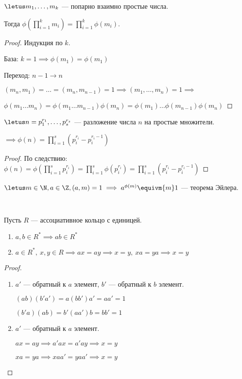 \begin{follow}
    $\letus m_1, \ldots, m_k$ --- попарно взаимно простые числа.

    Тогда $\phi(\prod\limits_{i=1}^k m_i) = \prod\limits_{i=1}^k \phi(m_i)$.
\end{follow}

\begin{proof}
    Индукция по $k$.

    База: $k = 1 \implies \phi(m_1) = \phi(m_1)$
    
    Переход: $n-1 \to n$
    
    $(m_n, m_1) = \ldots = (m_n, m_{n-1}) = 1 \implies (m_1, \ldots, m_n) = 1 \implies$
    
    $\phi(m_1 \ldots m_n) = \phi(m_1 \ldots m_{n-1}) \phi(m_n) = \phi(m_1) \ldots \phi(m_{n-1}) \phi(m_n)$
\end{proof}

\begin{follow}
    $\letus n = p_1^{r_1}, \ldots, p_s^{r_s}$ --- разложение числа $n$ на простые множители.
    
    $\implies \phi(n) = \prod\limits_{i=1}^s (p_i^{r_i} - p_i^{r_i-1})$
\end{follow}

\begin{proof}
    По следствию: $\phi(n) = \phi(\prod\limits_{i=1}^s p_i^{r_i}) = \prod\limits_{i=1}^s \phi(p_i^{r_i}) = \prod\limits_{i=1}^s (p_i^{r_i} - p_i^{r_i-1})$
\end{proof}

\begin{theorem}
    $\letus m \in \N, a \in \Z, (a, m) = 1 \implies a^{\phi(m)} \equivm{m} 1$ --- теорема Эйлера.
\end{theorem}

\begin{lemma}~

    Пусть $R$ --- ассоциативное кольцо с единицей.
    \begin{enumerate}
        \item $a, b \in R^* \implies ab \in R^*$
        
        \item $a \in R^*,~x,y \in R \implies ax = ay \implies x = y,~xa = ya \implies x = y$
    \end{enumerate}
\end{lemma}

\begin{proof}
    \begin{enumerate}
        \item $a'$ --- обратный к $a$ элемент, $b'$ --- обратный к $b$ элемент.
        
        $(ab)(b'a') = a(bb')a' = aa' = 1$
        
        $(b'a)(ab) = b'(aa')b = bb' = 1$
        
        \item $a'$ --- обратный к $a$ элемент.
        
        $ax = ay \implies a'ax = a'ay \implies x = y$
        
        $xa = ya \implies xaa' = yaa' \implies x = y$
    \end{enumerate}
\end{proof}


